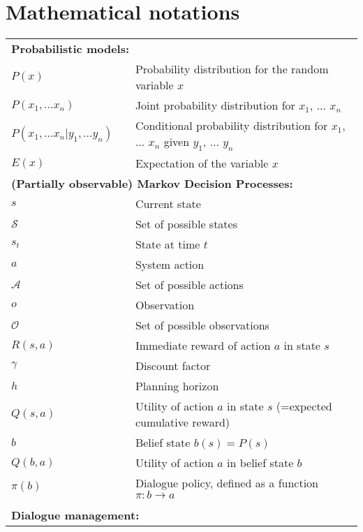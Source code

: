 
\chapter*{Mathematical notations}
\thispagestyle{empty}


\begin{tabular}{lp{5mm}p{11cm}}
\multicolumn{3}{l}{\textbf{Probabilistic models:}} \\
$P(x)$ && Probability distribution for the random variable $x$ \\
$P(x_1, ...x_n)$ && Joint probability distribution for $x_1$, ... $x_n$ \\
$P(x_1,...x_n | y_1, ... y_n)$ && Conditional probability distribution for $x_1$, ... $x_n$ given $y_1$, ... $y_n$  \\ 
$E(x)$ && Expectation of the variable $x$ \vspace{4mm} \\
\multicolumn{3}{l}{\textbf{(Partially observable) Markov Decision Processes:}} \\
$s$ && Current state \\
$\mathcal{S}$ && Set of possible states \\
$s_t$ && State at time $t$ \\
$a$ && System action \\ 
$\mathcal{A}$ && Set of possible actions \\
$o$ && Observation \\
$\mathcal{O}$ && Set of possible observations \\
$R(s,a)$ && Immediate reward of action $a$ in state $s$ \\
$\gamma$ && Discount factor \\
$h$ && Planning horizon \\
$Q(s,a)$ && Utility  of action $a$ in state $s$ (=expected cumulative reward) \\
$b$ && Belief state $b(s) = P(s)$ \\
$Q(b,a)$ && Utility  of action $a$ in belief state $b$ \\
$\pi(b)$ && Dialogue policy, defined as a function $\pi: b \rightarrow a$ \\

&&  \vspace{4mm} \\
\multicolumn{3}{l}{\textbf{Dialogue management:}} \\


\end{tabular}
